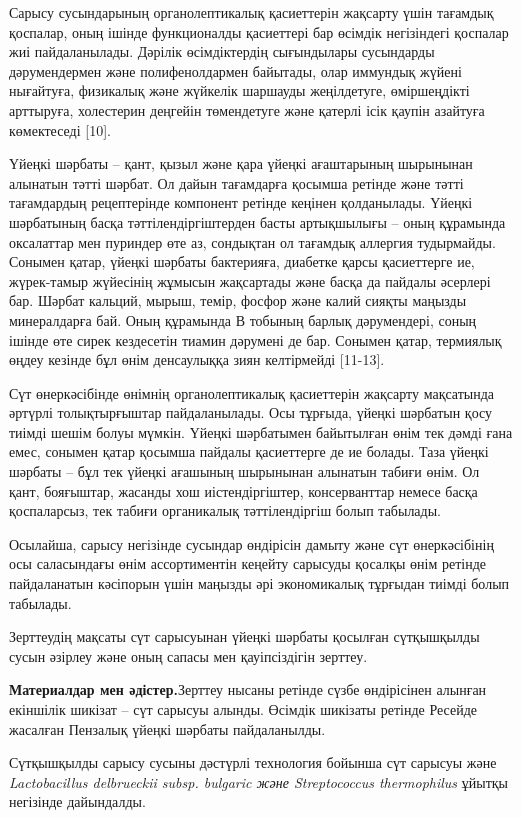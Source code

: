 \begin{multicols}{2}
Сарысу сусындарының органолептикалық қасиеттерін жақсарту үшін тағамдық
қоспалар, оның ішінде функционалды қасиеттері бар өсімдік негізіндегі
қоспалар жиі пайдаланылады. Дәрілік өсімдіктердің сығындылары сусындарды
дәрумендермен және полифенолдармен байытады, олар иммундық жүйені
нығайтуға, физикалық және жүйкелік шаршауды жеңілдетуге, өміршеңдікті
арттыруға, холестерин деңгейін төмендетуге және қатерлі ісік қаупін
азайтуға көмектеседі {[}10{]}.

Үйеңкі шәрбаты -- қант, қызыл және қара үйеңкі ағаштарының шырынынан
алынатын тәтті шәрбат. Ол дайын тағамдарға қосымша ретінде және тәтті
тағамдардың рецептерінде компонент ретінде кеңінен қолданылады. Үйеңкі
шәрбатының басқа тәттілендіргіштерден басты артықшылығы -- оның
құрамында оксалаттар мен пуриндер өте аз, сондықтан ол тағамдық аллергия
тудырмайды. Сонымен қатар, үйеңкі шәрбаты бактерияға, диабетке қарсы
қасиеттерге ие, жүрек-тамыр жүйесінің жұмысын жақсартады және басқа да
пайдалы әсерлері бар. Шәрбат кальций, мырыш, темір, фосфор және калий
сияқты маңызды минералдарға бай. Оның құрамында В тобының барлық
дәрумендері, соның ішінде өте сирек кездесетін тиамин дәрумені де бар.
Сонымен қатар, термиялық өңдеу кезінде бұл өнім денсаулыққа зиян
келтірмейді {[}11-13{]}.

Сүт өнеркәсібінде өнімнің органолептикалық қасиеттерін жақсарту
мақсатында әртүрлі толықтырғыштар пайдаланылады. Осы тұрғыда, үйеңкі
шәрбатын қосу тиімді шешім болуы мүмкін. Үйеңкі шәрбатымен байытылған
өнім тек дәмді ғана емес, сонымен қатар қосымша пайдалы қасиеттерге де
ие болады. Таза үйеңкі шәрбаты -- бұл тек үйеңкі ағашының шырынынан
алынатын табиғи өнім. Ол қант, бояғыштар, жасанды хош иістендіргіштер,
консерванттар немесе басқа қоспаларсыз, тек табиғи органикалық
тәттілендіргіш болып табылады.

Осылайша, сарысу негізінде сусындар өндірісін дамыту және сүт
өнеркәсібінің осы саласындағы өнім ассортиментін кеңейту сарысуды
қосалқы өнім ретінде пайдаланатын кәсіпорын үшін маңызды әрі
экономикалық тұрғыдан тиімді болып табылады.

Зерттеудің мақсаты сүт сарысуынан үйеңкі шәрбаты қосылған сүтқышқылды
сусын әзірлеу және оның сапасы мен қауіпсіздігін зерттеу.

{\bfseries Материалдар мен әдістер.}Зерттеу нысаны ретінде сүзбе
өндірісінен алынған екіншілік шикізат -- сүт сарысуы алынды. Өсімдік
шикізаты ретінде Ресейде жасалған Пензалық үйеңкі шәрбаты пайдаланылды.

Сүтқышқылды сарысу сусыны дәстүрлі технология бойынша сүт сарысуы және
\emph{Lactobacillus delbrueckii subsp. bulgaric және Streptococcus
thermophilus} ұйытқы негізінде дайындалды.


\end{multicols}
